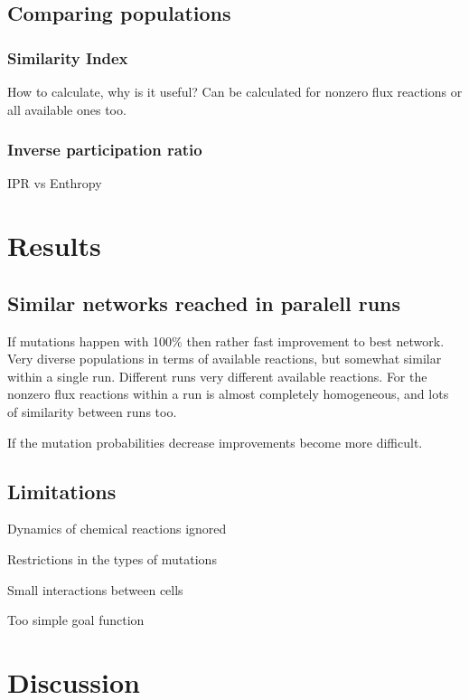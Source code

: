 \documentclass[]{article}
\begin{document}
\subsection{Comparing populations}
\label{sub:comparing_populations}


\subsubsection{Similarity Index}
\label{ssub:Similarity Index}

How to calculate, why is it useful? Can be calculated for nonzero flux reactions or all available ones too. 

\subsubsection{Inverse participation ratio}
\label{ssub:Inverse participation ratio}
IPR vs Enthropy

\section{Results}
\label{sec:results}

\subsection{Similar networks reached in paralell runs}
\label{sub:similar_networks_reached_in_paralell_runs}


If mutations happen with 100$\%$ then rather fast improvement to best network. Very diverse populations in terms of available reactions, but somewhat similar within a single run. Different runs very different available reactions. For the nonzero flux reactions within a run is almost completely homogeneous, and lots of similarity between runs too. 

If the mutation probabilities decrease improvements become more difficult.

\subsection{Limitations}
\label{sub:limitations}
Dynamics of chemical reactions ignored

Restrictions in the types of mutations

Small interactions between cells

Too simple goal function



\section{Discussion}
\label{sec:discussion}
\end{document}
